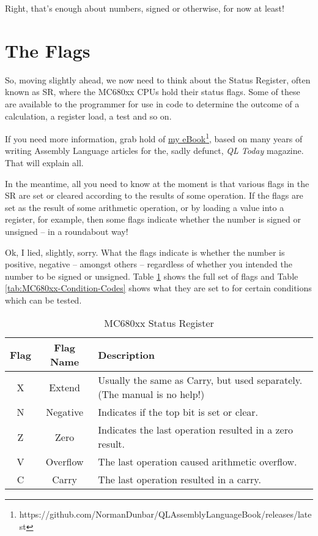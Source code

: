 Right, that's enough about numbers, signed or otherwise, for now at
least!

\section{The Flags}

So, moving slightly ahead, we now need to think about the Status Register,
often known as SR, where the MC680xx CPUs hold their status flags.
Some of these are available to the programmer for use in code to determine
the outcome of a calculation, a register load, a test and so on.

If you need more information, grab hold of \href{https://github.com/NormanDunbar/QLAssemblyLanguageBook/releases/latest}{my eBook}\footnote{https://github.com/NormanDunbar/QLAssemblyLanguageBook/releases/latest},
based on many years of writing Assembly Language articles for the,
sadly defunct, \emph{QL Today} magazine. That will explain all.

In the meantime, all you need to know at the moment is that various
flags in the SR are set or cleared according to the results of some
operation. If the flags are set as the result of some arithmetic operation,
or by loading a value into a register, for example, then some flags
indicate whether the number is signed or unsigned -- in a roundabout
way!

Ok, I lied, slightly, sorry. What the flags indicate is whether the
number is positive, negative -- amongst others -- regardless of
whether you intended the number to be signed or unsigned. Table \ref{tab:MC680xx-Status-Register}
shows the full set of flags and Table \ref{tab:MC680xx-Condition-Codes}
shows what they are set to for certain conditions which can be tested.

\begin{table}[!h]
\begin{centering}
\begin{tabular}{|c|c|>{\centering}p{}|}
\hline 
\textbf{Flag} & \textbf{Flag Name} & \textbf{Description}\tabularnewline
\hline 
\hline 
X & Extend & Usually the same as Carry, but used separately. (The manual is no
help!)\tabularnewline
\hline 
N & Negative & Indicates if the top bit is set or clear.\tabularnewline
\hline 
Z & Zero & Indicates the last operation resulted in a zero result.\tabularnewline
\hline 
V & Overflow & The last operation caused arithmetic overflow.\tabularnewline
\hline 
C & Carry & The last operation resulted in a carry.\tabularnewline
\hline 
\end{tabular}
\par\end{centering}
\caption{MC680xx Status Register\label{tab:MC680xx-Status-Register}}
\end{table}


